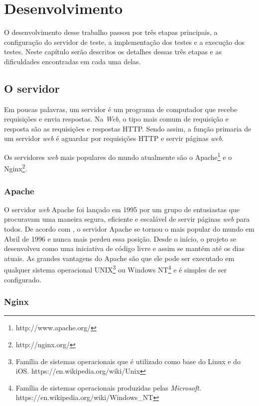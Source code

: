 %
%

\chapter{Desenvolvimento}

O desenvolvimento desse trabalho passou por três etapas principais, a configuração do servidor de teste, a implementação dos testes e a execução dos testes. Neste capítulo serão descritos os detalhes dessas três etapas e as dificuldades encontradas em cada uma delas.

\section{O servidor}
\label{oservidor}

Em poucas palavras, um servidor é um programa de computador que recebe requisições e envia respostas. Na \textit{Web}, o tipo mais comum de requisição e resposta são as requisições e respostas HTTP. Sendo assim, a função primaria de um servidor \textit{web} é aguardar por requisições HTTP e servir páginas \textit{web}.

Os servidores \textit{web} mais populares do mundo atualmente são o Apache\footnote{http://www.apache.org/} e o Nginx\footnote{http://nginx.org/}.

\subsection{Apache}
\label{apache}

O servidor \textit{web} Apache foi lançado em 1995 por um grupo de entusiastas que procuravam uma maneira segura, eficiente e escalável de servir páginas \textit{web} para todos.  De acordo com , o servidor Apache se tornou o mais popular do mundo em Abril de 1996 e nunca mais perdeu essa posição. Desde o início, o projeto se desenvolveu como uma iniciativa de código livre e assim se mantém até os dias atuais. As grandes vantagens do Apache são que ele pode ser executado em qualquer sistema operacional UNIX\footnote{Família de sistemas operacionais que é utilizado como base do Linux e do iOS. https://en.wikipedia.org/wiki/Unix} ou Windows NT\footnote{Família de sistemas operacionais produzidas pelas \textit{Microsoft}. https://en.wikipedia.org/wiki/Windows\_NT} e é simples de ser configurado.

\subsection{Nginx}
\label{nginx}

